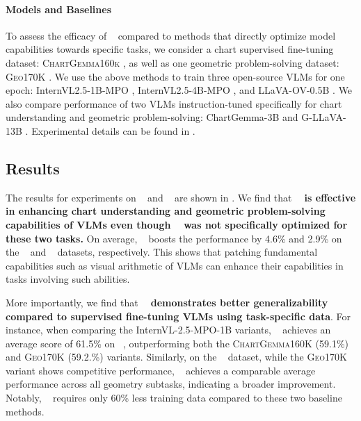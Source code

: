 
\paragraph{Models and Baselines}


To assess the efficacy of \method~ compared to methods that directly optimize model capabilities towards specific tasks, we consider a chart supervised fine-tuning dataset: \textsc{ChartGemma160k} \cite{masry2024chartgemma}, as well as one geometric problem-solving dataset: \textsc{Geo170K} \cite{gao2023gllava}. 
We use the above methods to train three open-source VLMs for one epoch: InternVL2.5-1B-MPO \cite{wang2024mpo}, InternVL2.5-4B-MPO \cite{wang2024mpo}, and LLaVA-OV-0.5B \cite{li2024llavaov}. %
We also compare performance of two VLMs instruction-tuned specifically for chart understanding and geometric problem-solving: ChartGemma-3B \cite{masry2024chartgemma} and G-LLaVA-13B \cite{gao2023gllava}. Experimental details can be found in .





\subsection{Results}
\label{subsec:results}


The results for experiments on \chocolate~ and \mathv~ are shown in . We find that \textbf{\method~ is effective in enhancing chart understanding and geometric problem-solving capabilities of VLMs even though \method~ was not specifically optimized for these two tasks.} On average, \method~ boosts the performance by 4.6\% and 2.9\% on the \chocolate~ and \mathv~ datasets, respectively. This shows that patching fundamental capabilities such as visual arithmetic of VLMs can enhance their capabilities in tasks involving such abilities. %

More importantly, we find that \textbf{\method~ demonstrates better generalizability compared to supervised fine-tuning VLMs using task-specific data}. For instance, when comparing the InternVL-2.5-MPO-1B variants, \method~ achieves an average score of 61.5\% on \chocolate~, outperforming both the \textsc{ChartGemma160K} (59.1\%) and \textsc{Geo170K} (59.2.\%) variants. Similarly, on the \mathv~ dataset, while the \textsc{Geo170K} variant shows competitive performance, \method~ achieves a comparable average performance across all geometry subtasks, indicating a broader improvement.  Notably, \method~ requires only 60\% less training data compared to these two baseline methods. %




